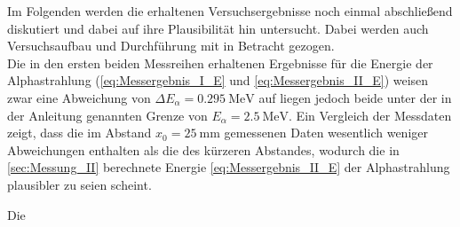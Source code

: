 Im Folgenden werden die erhaltenen Versuchsergebnisse noch einmal
abschließend diskutiert und dabei auf ihre Plausibilität hin untersucht.
Dabei werden auch Versuchsaufbau und Durchführung mit in Betracht gezogen.\\

Die in den ersten beiden Messreihen erhaltenen Ergebnisse für die 
Energie der Alphastrahlung (\cref{eq:Messergebnis_I_E} und \cref{eq:Messergebnis_II_E})
weisen zwar eine Abweichung von $\Delta E_{\alpha} = \SI{0.295}{\mega\eV}$ auf liegen
jedoch beide unter der in der Anleitung \cite{V701} genannten Grenze von 
$E_{\alpha} = \SI{2.5}{\mega\eV}$.
Ein Vergleich der Messdaten zeigt, dass die im Abstand $x_{0} = \SI{25}{\milli\meter}$ 
gemessenen Daten wesentlich weniger Abweichungen enthalten als die des kürzeren Abstandes,
wodurch die in \cref{sec:Messung_II}  berechnete Energie \cref{eq:Messergebnis_II_E} 
der Alphastrahlung plausibler zu seien scheint.  

Die  
